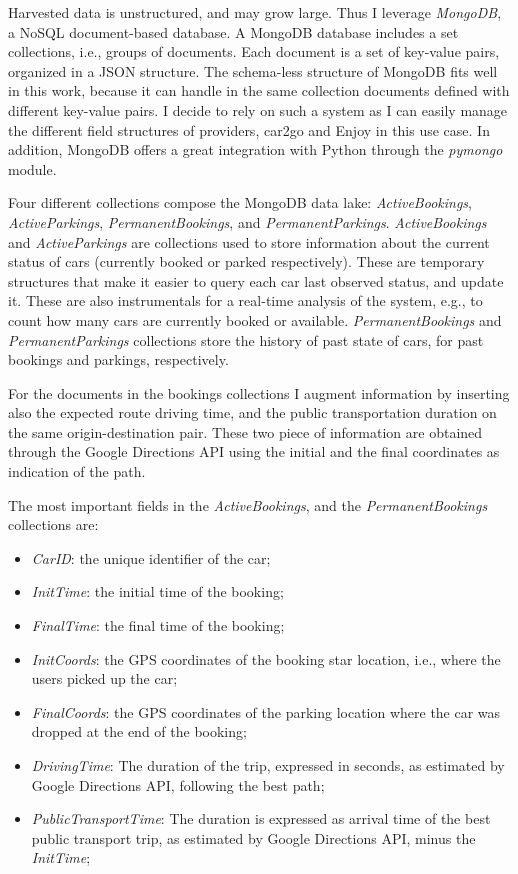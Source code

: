 Harvested data is unstructured, and may grow large. Thus I leverage \textit{MongoDB}, a NoSQL document-based database. A MongoDB database includes a set collections, i.e., groups of documents. Each document is a set of key-value pairs, organized in a JSON structure. The schema-less structure of MongoDB fits well in this work, because it can handle in the same collection documents defined with different key-value pairs. I decide to rely on such a system as I can easily manage the different field structures of providers, car2go and Enjoy in this use case. In addition, MongoDB offers a great integration with Python through the \textit{pymongo} module.

Four different collections compose the MongoDB data lake:  \textit{ActiveBookings}, \textit{ActiveParkings}, \textit{PermanentBookings}, and \textit{PermanentParkings}. 
\textit{ActiveBookings} and \textit{ActiveParkings} are collections used to store information about the current status of cars (currently booked or parked respectively). These are temporary structures that make it easier to query each car last observed status, and update it. These are also instrumentals for a real-time analysis of the system, e.g., to count how many cars are currently booked or available.
\textit{PermanentBookings} and \textit{PermanentParkings} collections store the history of past state of cars, for past bookings and parkings, respectively.

For the documents in the bookings collections I augment information by inserting also the expected route driving time, and the public transportation duration on the same origin-destination pair. These two piece of information are obtained through the Google Directions API using the initial and the final coordinates as indication of the path.

The most important fields in the \textit{ActiveBookings}, and the \textit{PermanentBookings} collections are:
\begin{itemize}
\setlength\itemsep{0.1em}
\item \textit{CarID}: the unique identifier of the car;
\item \textit{InitTime}: the initial time of the booking;
\item \textit{FinalTime}:  the final time of the booking;
\item \textit{InitCoords}:  the GPS coordinates of the booking star location, i.e., where the users picked up the car;
\item \textit{FinalCoords}:  the GPS coordinates of the parking location where the car was dropped at the end of the booking;
\item \textit{DrivingTime}: The duration of the trip, expressed in seconds, as estimated by Google Directions API, following the best path;
\item \textit{PublicTransportTime}: The duration is expressed as arrival time of the best public transport trip, as estimated by Google Directions API, minus the \textit{InitTime};
\end{itemize}


